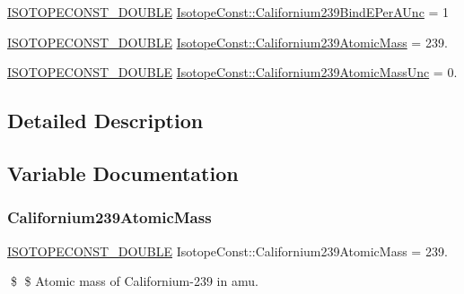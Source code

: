 \begin{DoxyCompactItemize}
\mbox{\hyperlink{group___isotope_const-_macros_ga8f45a7272ce02c0b4c65c44636ed719a}{I\+S\+O\+T\+O\+P\+E\+C\+O\+N\+S\+T\+\_\+\+D\+O\+U\+B\+LE}} \mbox{\hyperlink{group___isotope_const-_californium-_cf239_gaa860a6fc62d1d414cde4de552ecbc906}{Isotope\+Const\+::\+Californium239\+Bind\+E\+Per\+A\+Unc}} = 1
\item 
\mbox{\hyperlink{group___isotope_const-_macros_ga8f45a7272ce02c0b4c65c44636ed719a}{I\+S\+O\+T\+O\+P\+E\+C\+O\+N\+S\+T\+\_\+\+D\+O\+U\+B\+LE}} \mbox{\hyperlink{group___isotope_const-_californium-_cf239_ga4a17a78c8a37abae853e3376acecfedb}{Isotope\+Const\+::\+Californium239\+Atomic\+Mass}} = 239.
\item 
\mbox{\hyperlink{group___isotope_const-_macros_ga8f45a7272ce02c0b4c65c44636ed719a}{I\+S\+O\+T\+O\+P\+E\+C\+O\+N\+S\+T\+\_\+\+D\+O\+U\+B\+LE}} \mbox{\hyperlink{group___isotope_const-_californium-_cf239_ga0412c2c366768638bddd28b37bd16307}{Isotope\+Const\+::\+Californium239\+Atomic\+Mass\+Unc}} = 0.
\end{DoxyCompactItemize}


\subsection{Detailed Description}


\subsection{Variable Documentation}
\mbox{\label{group___isotope_const-_californium-_cf239_ga4a17a78c8a37abae853e3376acecfedb}} 
\subsubsection{\texorpdfstring{Californium239\+Atomic\+Mass}{Californium239AtomicMass}}
{\footnotesize\ttfamily \mbox{\hyperlink{group___isotope_const-_macros_ga8f45a7272ce02c0b4c65c44636ed719a}{I\+S\+O\+T\+O\+P\+E\+C\+O\+N\+S\+T\+\_\+\+D\+O\+U\+B\+LE}} Isotope\+Const\+::\+Californium239\+Atomic\+Mass = 239.}

\$ \$ Atomic mass of Californium-\/239 in amu. \mbox{\label{group___isotope_const-_californium-_cf239_ga0412c2c366768638bddd28b37bd16307}} 
